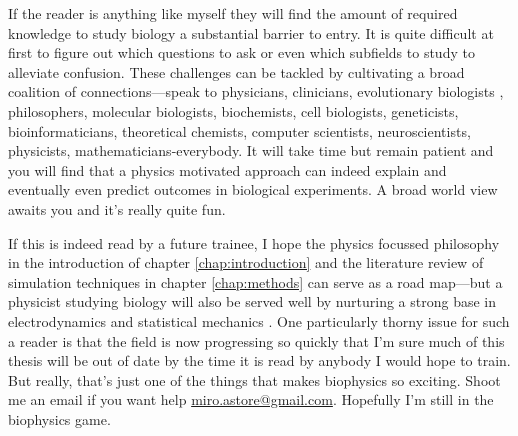 
If the reader is anything like myself they will find the amount of required knowledge to study biology a substantial barrier to entry. It is quite difficult at first to figure out which questions to ask or even which subfields to study to alleviate confusion. These challenges can be tackled by cultivating a broad coalition of connections---speak to physicians, clinicians, evolutionary biologists \cite{dawkins1989, dawkins2016}, philosophers, molecular biologists, biochemists, cell biologists\cite{pollard2016}, geneticists, bioinformaticians, theoretical chemists, computer scientists, neuroscientists, physicists, mathematicians-everybody. It will take time but remain patient and you will find that a physics motivated approach can indeed explain and eventually even predict outcomes in biological experiments. A broad world view awaits you and it's really quite fun. 


If this is indeed read by a future trainee, I hope the physics focussed philosophy in the introduction of chapter \ref{chap:introduction} and the literature review of simulation techniques in chapter \ref{chap:methods} can serve as a road map---but a physicist studying biology will also be served well by nurturing a strong base in electrodynamics and statistical mechanics \cite{griffiths2017, reif2009, zuckerman2010}. One particularly thorny issue for such a reader is that the field is now progressing so quickly that I'm sure much of this thesis will be out of date by the time it is read by anybody I would hope to train. But really, that's just one of the things that makes biophysics so exciting. Shoot me an email if you want help \href{mailto:miro.astore@gmailcom}{miro.astore@gmail.com}. Hopefully I'm still in the biophysics game.

